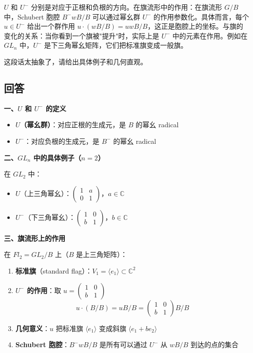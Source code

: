 $U$ 和 $U^-$ 分别是对应于正根和负根的方向。在旗流形中的作用：在旗流形 $G/B$ 中，Schubert 胞腔 $B^-wB/B$ 可以通过幂幺群 $U^-$ 的作用参数化。具体而言，每个 $u \in U^-$ 给出一个群作用 $u \cdot (wB/B) = uwB/B$，这正是胞腔上的坐标。与旗的变化的关系：当你看到一个旗被"提升"时，实际上是 $U^-$ 中的元素在作用。例如在 $GL_n$ 中，$U^-$ 是下三角幂幺矩阵，它们把标准旗变成一般旗。

这段话太抽象了，请给出具体例子和几何直观。

\subsection{回答}
\textbf{一、$U$ 和 $U^-$ 的定义}

\begin{itemize}
\item \textbf{$U$（幂幺群）}：对应正根的生成元，是 $B$ 的幂幺 radical
\item \textbf{$U^-$}：对应负根的生成元，是 $B^-$ 的幂幺 radical
\end{itemize}

\textbf{二、$GL_n$ 中的具体例子（$n=2$）}

在 $GL_2$ 中：
\begin{itemize}
\item \textbf{$U$}（上三角幂幺）：$\begin{pmatrix} 1 & a \\ 0 & 1 \end{pmatrix}$，$a \in \mathbb{C}$
\item \textbf{$U^-$}（下三角幂幺）：$\begin{pmatrix} 1 & 0 \\ b & 1 \end{pmatrix}$，$b \in \mathbb{C}$
\end{itemize}

\textbf{三、旗流形上的作用}

在 $Fl_2 = GL_2/B$ 上（$B$ 是上三角矩阵）：

\begin{enumerate}
\item \textbf{标准旗}（standard flag）：$V_1 = \langle e_1 \rangle \subset \mathbb{C}^2$

\item \textbf{$U^-$ 的作用}：取 $u = \begin{pmatrix} 1 & 0 \\ b & 1 \end{pmatrix}$
$$u \cdot (B/B) = uB/B = \begin{pmatrix} 1 & 0 \\ b & 1 \end{pmatrix} B/B$$

\item \textbf{几何意义}：$u$ 把标准旗 $\langle e_1 \rangle$ 变成斜旗 $\langle e_1 + be_2 \rangle$

\item \textbf{Schubert 胞腔}：$B^-wB/B$ 是所有可以通过 $U^-$ 从 $wB/B$ 到达的点的集合
\end{enumerate}

